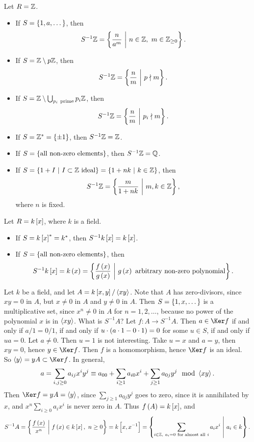 \begin{example*}
Let $ R = \mathbb{Z} $.
\begin{itemize}
\item If $ S = \cbr{1, a, \dots} $, then
$$ S^{-1}\ZZ = \cbr{\dfrac{n}{a^m} \st n \in \ZZ, \ m \in \ZZ_{\ge 0}}. $$
\item If $ S = \mathbb{Z} \setminus p\mathbb{Z} $, then
$$ S^{-1}\ZZ = \cbr{\dfrac{n}{m} \st p \nmid m}. $$
\item If $ S = \ZZ \setminus \bigcup_{p_i \ \text{prime}} p_i\ZZ $, then
$$ S^{-1}\ZZ = \cbr{\dfrac{n}{m} \st p_i \nmid m}. $$
\item If $ S = \ZZ^* = \cbr{\pm 1} $, then $ S^{-1}\mathbb{Z} = \mathbb{Z} $.
\item If $ S = \cbr{\text{all non-zero elements}} $, then $ S^{-1}\mathbb{Z} = \mathbb{Q} $.
\item If $ S = \cbr{1 + I \st I \subset \ZZ \ \text{ideal}} = \cbr{1 + nk \st k \in \ZZ} $, then
$$ S^{-1}\ZZ = \cbr{\dfrac{m}{1 + nk} \st m, k \in \ZZ}, $$
where $ n $ is fixed.
\end{itemize}
\end{example*}

\begin{example*}
Let $ R = k\sbr{x} $, where $ k $ is a field.
\begin{itemize}
\item If $ S = k\sbr{x}^* = k^* $, then $ S^{-1}k\sbr{x} = k\sbr{x} $.
\item If $ S = \cbr{\text{all non-zero elements}} $, then
$$ S^{-1}k\sbr{x} = k\br{x} = \cbr{\dfrac{f\br{x}}{g\br{x}} \st g\br{x} \ \text{arbitrary non-zero polynomial}}. $$
\end{itemize}
\end{example*}

\begin{example}
Let $ k $ be a field, and let $ A = k\sbr{x, y} / \abr{xy} $. Note that $ A $ has zero-divisors, since $ xy = 0 $ in $ A $, but $ x \ne 0 $ in $ A $ and $ y \ne 0 $ in $ A $. Then $ S = \cbr{1, x, \dots} $ is a multiplicative set, since $ x^n \ne 0 $ in $ A $ for $ n = 1, 2, \dots $, because no power of the polynomial $ x $ is in $ \left\langle xy \right\rangle $. What is $ S^{-1}A $? Let $ f : A \to S^{-1}A $. Then $ a \in \Ker f $ if and only if $ a / 1 = 0 / 1 $, if and only if $ u \cdot \br{a \cdot 1 - 0 \cdot 1} = 0 $ for some $ u \in S $, if and only if $ ua = 0 $. Let $ a \ne 0 $. Then $ u = 1 $ is not interesting. Take $ u = x $ and $ a = y $, then $ xy = 0 $, hence $ y \in \Ker f $. Then $ f $ is a homomorphism, hence $ \Ker f $ is an ideal. So $ \abr{y} = yA \subset \Ker f $. In general,
$$ a = \sum_{i, j \ge 0} a_{ij}x^iy^j \equiv a_{00} + \sum_{i \ge 1} a_{i0}x^i + \sum_{j \ge 1} a_{0j}y^j \mod \abr{xy}. $$
Then $ \Ker f = yA = \abr{y} $, since $ \sum_{j \ge 1} a_{0j}y^j $ goes to zero, since it is annihilated by $ x $, and $ x^n\sum_{i \ge 0} a_ix^i $ is never zero in $ A $. Thus $ f\br{A} = k\sbr{x} $, and
$$ S^{-1}A = \cbr{\dfrac{f\br{x}}{x^n} \st f\br{x} \in k\sbr{x}, \ n \ge 0} = k\sbr{x, x^{-1}} = \cbr{\sum_{i \in \ZZ, \ a_i = 0 \ \text{for almost all} \ i} a_ix^i \st a_i \in k}. $$
\end{example}

